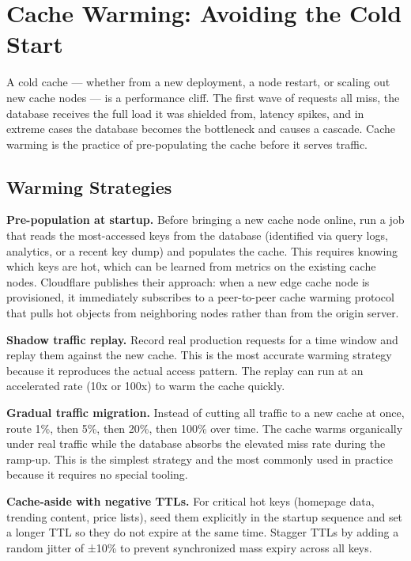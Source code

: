 \documentclass[11pt,a4paper]{article}
\begin{document}
\section{Cache Warming: Avoiding the Cold Start}

A cold cache --- whether from a new deployment, a node restart, or scaling out new cache nodes --- is a performance cliff. The first wave of requests all miss, the database receives the full load it was shielded from, latency spikes, and in extreme cases the database becomes the bottleneck and causes a cascade. Cache warming is the practice of pre-populating the cache before it serves traffic.

\subsection{Warming Strategies}

\textbf{Pre-population at startup.} Before bringing a new cache node online, run a job that reads the most-accessed keys from the database (identified via query logs, analytics, or a recent key dump) and populates the cache. This requires knowing which keys are hot, which can be learned from metrics on the existing cache nodes. Cloudflare publishes their approach: when a new edge cache node is provisioned, it immediately subscribes to a peer-to-peer cache warming protocol that pulls hot objects from neighboring nodes rather than from the origin server.

\textbf{Shadow traffic replay.} Record real production requests for a time window and replay them against the new cache. This is the most accurate warming strategy because it reproduces the actual access pattern. The replay can run at an accelerated rate (10x or 100x) to warm the cache quickly.

\textbf{Gradual traffic migration.} Instead of cutting all traffic to a new cache at once, route 1\%, then 5\%, then 20\%, then 100\% over time. The cache warms organically under real traffic while the database absorbs the elevated miss rate during the ramp-up. This is the simplest strategy and the most commonly used in practice because it requires no special tooling.

\textbf{Cache-aside with negative TTLs.} For critical hot keys (homepage data, trending content, price lists), seed them explicitly in the startup sequence and set a longer TTL so they do not expire at the same time. Stagger TTLs by adding a random jitter of ±10\% to prevent synchronized mass expiry across all keys.
\end{document}
